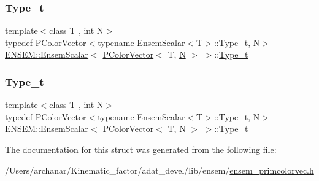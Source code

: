 \subsubsection{\texorpdfstring{Type\_t}{Type\_t}\hspace{0.1cm}{\footnotesize\ttfamily [1/2]}}
{\footnotesize\ttfamily template$<$class T , int N$>$ \\
typedef \mbox{\hyperlink{classENSEM_1_1PColorVector}{P\+Color\+Vector}}$<$typename \mbox{\hyperlink{structENSEM_1_1EnsemScalar}{Ensem\+Scalar}}$<$T$>$\+::\mbox{\hyperlink{structENSEM_1_1EnsemScalar_3_01PColorVector_3_01T_00_01N_01_4_01_4_a7a37dbe2ba322ec20fb55d0359c3f149}{Type\+\_\+t}}, \mbox{\hyperlink{operator__name__util_8cc_a7722c8ecbb62d99aee7ce68b1752f337}{N}}$>$ \mbox{\hyperlink{structENSEM_1_1EnsemScalar}{E\+N\+S\+E\+M\+::\+Ensem\+Scalar}}$<$ \mbox{\hyperlink{classENSEM_1_1PColorVector}{P\+Color\+Vector}}$<$ T, \mbox{\hyperlink{operator__name__util_8cc_a7722c8ecbb62d99aee7ce68b1752f337}{N}} $>$ $>$\+::\mbox{\hyperlink{structENSEM_1_1EnsemScalar_3_01PColorVector_3_01T_00_01N_01_4_01_4_a7a37dbe2ba322ec20fb55d0359c3f149}{Type\+\_\+t}}}

\mbox{\label{structENSEM_1_1EnsemScalar_3_01PColorVector_3_01T_00_01N_01_4_01_4_a7a37dbe2ba322ec20fb55d0359c3f149}} 
\subsubsection{\texorpdfstring{Type\_t}{Type\_t}\hspace{0.1cm}{\footnotesize\ttfamily [2/2]}}
{\footnotesize\ttfamily template$<$class T , int N$>$ \\
typedef \mbox{\hyperlink{classENSEM_1_1PColorVector}{P\+Color\+Vector}}$<$typename \mbox{\hyperlink{structENSEM_1_1EnsemScalar}{Ensem\+Scalar}}$<$T$>$\+::\mbox{\hyperlink{structENSEM_1_1EnsemScalar_3_01PColorVector_3_01T_00_01N_01_4_01_4_a7a37dbe2ba322ec20fb55d0359c3f149}{Type\+\_\+t}}, \mbox{\hyperlink{operator__name__util_8cc_a7722c8ecbb62d99aee7ce68b1752f337}{N}}$>$ \mbox{\hyperlink{structENSEM_1_1EnsemScalar}{E\+N\+S\+E\+M\+::\+Ensem\+Scalar}}$<$ \mbox{\hyperlink{classENSEM_1_1PColorVector}{P\+Color\+Vector}}$<$ T, \mbox{\hyperlink{operator__name__util_8cc_a7722c8ecbb62d99aee7ce68b1752f337}{N}} $>$ $>$\+::\mbox{\hyperlink{structENSEM_1_1EnsemScalar_3_01PColorVector_3_01T_00_01N_01_4_01_4_a7a37dbe2ba322ec20fb55d0359c3f149}{Type\+\_\+t}}}



The documentation for this struct was generated from the following file\+:\begin{DoxyCompactItemize}
\item 
/\+Users/archanar/\+Kinematic\+\_\+factor/adat\+\_\+devel/lib/ensem/\mbox{\hyperlink{lib_2ensem_2ensem__primcolorvec_8h}{ensem\+\_\+primcolorvec.\+h}}\end{DoxyCompactItemize}
